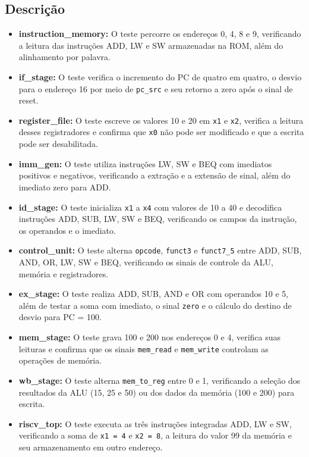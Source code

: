 \documentclass[12pt,a4paper,titlepage]{article}
\begin{document}
\subsection{Descrição}
\begin{itemize}
    \item \textbf{instruction\_memory:}
    O teste percorre os endereços 0, 4, 8 e 9, verificando a leitura das instruções ADD, LW e SW armazenadas na ROM, além do alinhamento por palavra.

    \item \textbf{if\_stage:}
    O teste verifica o incremento do PC de quatro em quatro, o desvio para o endereço 16 por meio de \texttt{pc\_src} e 
    seu retorno a zero após o sinal de reset.

    \item \textbf{register\_file:}
    O teste escreve os valores 10 e 20 em \texttt{x1} e \texttt{x2}, verifica a leitura desses registradores e confirma que \texttt{x0} não 
    pode ser modificado e que a escrita pode ser desabilitada.

    \item \textbf{imm\_gen:}
    O teste utiliza instruções LW, SW e BEQ com imediatos positivos e negativos, verificando a extração e a extensão de sinal, além do imediato zero para ADD.

    \item \textbf{id\_stage:}
    O teste inicializa \texttt{x1} a \texttt{x4} com valores de 10 a 40 e decodifica instruções ADD, SUB, LW, SW e BEQ, verificando os 
    campos da instrução, os operandos e o imediato.

    \item \textbf{control\_unit:}
    O teste alterna \texttt{opcode}, \texttt{funct3} e \texttt{funct7\_5} entre ADD, SUB, AND, OR, LW, SW e BEQ, verificando os 
    sinais de controle da ALU, memória e registradores.

    \item \textbf{ex\_stage:}
    O teste realiza ADD, SUB, AND e OR com operandos 10 e 5, além de testar a soma com imediato, o sinal \texttt{zero} e o cálculo do 
    destino de desvio para PC = 100.

    \item \textbf{mem\_stage:}
    O teste grava 100 e 200 nos endereços 0 e 4, verifica suas leituras e confirma que os sinais \texttt{mem\_read} e \texttt{mem\_write} 
    controlam as operações de memória.

    \item \textbf{wb\_stage:}
    O teste alterna \texttt{mem\_to\_reg} entre 0 e 1, verificando a seleção dos resultados da ALU (15, 25 e 50) ou dos 
    dados da memória (100 e 200) para escrita.

    \item \textbf{riscv\_top:}
    O teste executa as três instruções integradas ADD, LW e SW, verificando a soma de \texttt{x1 = 4} e \texttt{x2 = 8}, a leitura do valor 99 da memória 
    e seu armazenamento em outro endereço.
\end{itemize}
\end{document}
